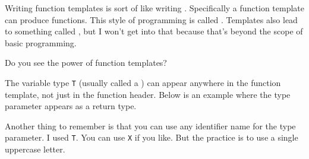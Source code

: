 Writing function templates is sort of like writing . Specifically a function template can produce functions. This style of programming is called . Templates also lead to something called , but I won't get into that because that's beyond the scope of basic programming.

Do you see the power of function templates?

The variable type \texttt{T} (usually called a ) can appear anywhere in the function template, not just in the function header. Below is an example where the type parameter appears as a return type.

Another thing to remember is that you can use any identifier name for the type parameter. I used \texttt{T}. You can use \texttt{X} if you like. But the practice is to use a single uppercase letter.






